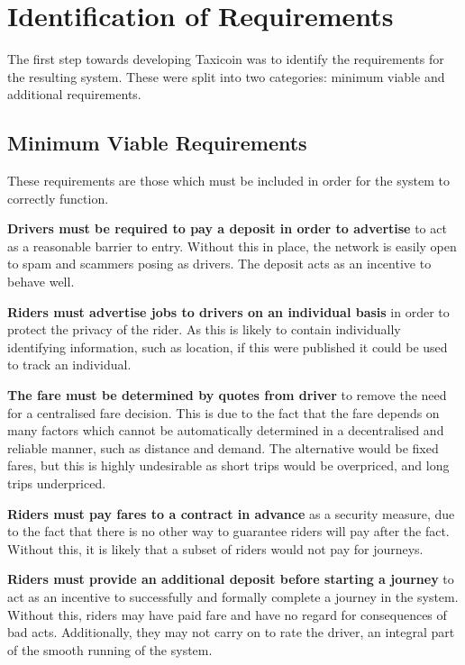 \section{Identification of Requirements}

The first step towards developing Taxicoin was to identify the requirements for the resulting system. These were split into two categories: minimum viable and additional requirements.

\subsection{Minimum Viable Requirements}

These requirements are those which must be included in order for the system to correctly function.

\bigskip\textbf{Drivers must be required to pay a deposit in order to advertise} to act as a reasonable barrier to entry. Without this in place, the network is easily open to spam and scammers posing as drivers. The deposit acts as an incentive to behave well.

\bigskip\textbf{Riders must advertise jobs to drivers on an individual basis} in order to protect the privacy of the rider. As this is likely to contain individually identifying information, such as location, if this were published it could be used to track an individual.

\bigskip\textbf{The fare must be determined by quotes from driver} to remove the need for a centralised fare decision. This is due to the fact that the fare depends on many factors which cannot be automatically determined in a decentralised and reliable manner, such as distance and demand. The alternative would be fixed fares, but this is highly undesirable as short trips would be overpriced, and long trips underpriced.

\bigskip\textbf{Riders must pay fares to a contract in advance} as a security measure, due to the fact that there is no other way to guarantee riders will pay after the fact. Without this, it is likely that a subset of riders would not pay for journeys.

\bigskip\textbf{Riders must provide an additional deposit before starting a journey} to act as an incentive to successfully and formally complete a journey in the system. Without this, riders may have paid fare and have no regard for consequences of bad acts. Additionally, they may not carry on to rate the driver, an integral part of the smooth running of the system.


